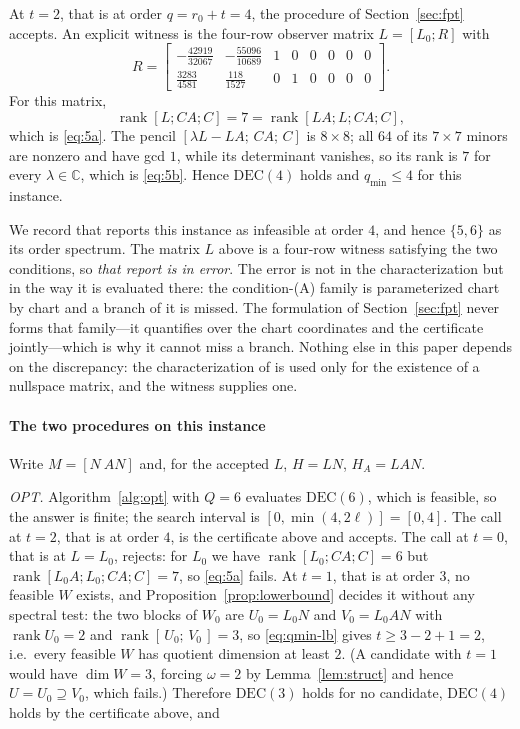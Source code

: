 \documentclass[journal]{IEEEtran}
\theoremstyle{plainn}
\theoremstyle{remark}
\begin{document}
At $t=2$, that is at order $q=r_0+t=4$, the procedure of Section~\ref{sec:fpt} accepts. An explicit
witness is the four-row observer matrix $L=[L_0;R]$ with
\begin{equation*}
R=\begin{bmatrix}
-\tfrac{42919}{32067} & -\tfrac{55096}{10689} & 1 & 0 & 0 & 0 & 0 & 0\\
\tfrac{3283}{4581} & \tfrac{118}{1527} & 0 & 1 & 0 & 0 & 0 & 0
\end{bmatrix}.
\end{equation*}
For this matrix,
\begin{equation*}
\operatorname{rank}[L;CA;C]=7=\operatorname{rank}[LA;L;CA;C],
\end{equation*}
which is \eqref{eq:5a}. The pencil $[\lambda L-LA;\,CA;\,C]$ is $8\times8$; all $64$ of its
$7\times7$ minors are nonzero and have gcd $1$, while its determinant vanishes, so its rank is $7$
for every $\lambda\in\mathbb C$, which is \eqref{eq:5b}. Hence $\mathrm{DEC}(4)$ holds and
$q_{\min}\le4$ for this instance.

We record that \cite[Sec.~VII-B]{fer26b} reports this instance as infeasible at order $4$, and
hence $\{5,6\}$ as its order spectrum. The matrix $L$ above is a four-row witness satisfying the
two conditions, so \emph{that report is in error}. The error is not in the characterization but in
the way it is evaluated there: the condition-(A) family is parameterized chart by chart and a
branch of it is missed. The formulation of Section~\ref{sec:fpt} never forms that family---it
quantifies over the chart coordinates and the certificate jointly---which is why it cannot miss a
branch. Nothing else in this paper depends on the discrepancy: the characterization of
\cite{fer26b} is used only for the existence of a nullspace matrix, and the witness supplies one.

\paragraph*{The two procedures on this instance}
Write $M=[N\ AN]$ and, for the accepted $L$, $H=LN$, $H_A=LAN$.

\emph{OPT.} Algorithm~\ref{alg:opt} with $Q=6$ evaluates $\mathrm{DEC}(6)$, which is feasible, so the
answer is finite; the search interval is $[0,\min(4,2\ell)]=[0,4]$. The call at $t=2$, that is at
order $4$, is the certificate above and accepts. The call at $t=0$, that is at $L=L_0$, rejects: for
$L_0$ we have $\operatorname{rank}[L_0;CA;C]=6$ but $\operatorname{rank}[L_0A;L_0;CA;C]=7$, so
\eqref{eq:5a} fails. At $t=1$, that is at order $3$, no feasible $W$ exists, and Proposition~\ref{prop:lowerbound}
decides it without any spectral test: the two blocks of $W_0$ are $U_0=L_0N$ and $V_0=L_0AN$ with
$\operatorname{rank}U_0=2$ and $\operatorname{rank}[\,U_0;\,V_0\,]=3$, so \eqref{eq:qmin-lb} gives
$t\ge3-2+1=2$, i.e.\ every feasible $W$ has quotient dimension at least $2$. (A candidate with $t=1$
would have $\dim W=3$, forcing $\omega=2$ by Lemma~\ref{lem:struct} and hence $U=U_0\supseteq V_0$,
which fails.) Therefore $\mathrm{DEC}(3)$ holds for no candidate, $\mathrm{DEC}(4)$ holds by the
certificate above, and
\end{document}

